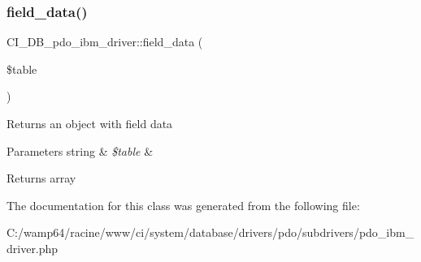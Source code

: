 \subsubsection{\texorpdfstring{field\+\_\+data()}{field\_data()}}
{\footnotesize\ttfamily C\+I\+\_\+\+D\+B\+\_\+pdo\+\_\+ibm\+\_\+driver\+::field\+\_\+data (\begin{DoxyParamCaption}\item[{}]{\$table }\end{DoxyParamCaption})}

Returns an object with field data


\begin{DoxyParams}[1]{Parameters}
string & {\em \$table} & \\
\hline
\end{DoxyParams}
\begin{DoxyReturn}{Returns}
array 
\end{DoxyReturn}


The documentation for this class was generated from the following file\+:\begin{DoxyCompactItemize}
\item 
C\+:/wamp64/racine/www/ci/system/database/drivers/pdo/subdrivers/pdo\+\_\+ibm\+\_\+driver.\+php\end{DoxyCompactItemize}
